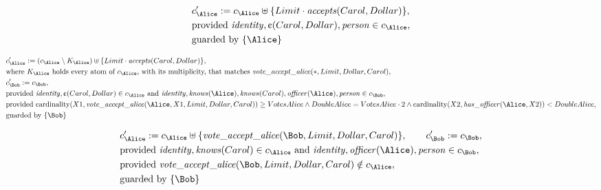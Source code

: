 \begin{align*}
&
c'_
{
\Alice
}
 := 
c_
{
\Alice
}
 \uplus 
\{
Limit
\cdot
\mathit{\detokenize{
accepts
}}
(
Carol
,
Dollar
)
\}
,\\
&
\text{provided } 
\mathit{\detokenize{
identity
}}
,
\text{\textcent}
(
Carol
,
Dollar
)
,
\mathit{\detokenize{
person
}}
 \in c_
{
\Alice
}
,\\
&
\text{guarded by } \{
\Alice
\}
\end{align*}

\begin{align*}
&
c'_
{
\Alice
}
 := 
(
c_
{
\Alice
}
 \setminus K_
{
\Alice
}
) \uplus 
\{
Limit
\cdot
\mathit{\detokenize{
accepts
}}
(
Carol
,
Dollar
)
\}
,\\
&
\text{where } K_
{
\Alice
}
 \text{ holds every atom of } c_
{
\Alice
}
 \text{, with its multiplicity, that matches } 
\mathit{\detokenize{
vote_accept_alice
}}
(
\ast
,
Limit
,
Dollar
,
Carol
)
,\\
&
c'_
{
\Bob
}
 := 
c_
{
\Bob
}
,\\
&
\text{provided } 
\mathit{\detokenize{
identity
}}
,
\text{\textcent}
(
Carol
,
Dollar
)
 \in c_
{
\Alice
}
 \text{ and } 
\mathit{\detokenize{
identity
}}
,
\mathit{\detokenize{
knows
}}
(
\Alice
)
,
\mathit{\detokenize{
knows
}}
(
Carol
)
,
\mathit{\detokenize{
officer
}}
(
\Alice
)
,
\mathit{\detokenize{
person
}}
 \in c_
{
\Bob
}
,\\
&
\text{provided } 
\mathrm{cardinality}(
X1
,
\mathit{\detokenize{
vote_accept_alice
}}
(
\Alice
,
X1
,
Limit
,
Dollar
,
Carol
)
)
\ge
VotesAlice
\land
DoubleAlice
=
VotesAlice
\cdot
2
\land
\mathrm{cardinality}(
X2
,
\mathit{\detokenize{
has_officer
}}
(
\Alice
,
X2
)
)
<
DoubleAlice
,\\
&
\text{guarded by } \{
\Bob
\}
\end{align*}

\begin{align*}
&
c'_
{
\Alice
}
 := 
c_
{
\Alice
}
 \uplus 
\{
\mathit{\detokenize{
vote_accept_alice
}}
(
\Bob
,
Limit
,
Dollar
,
Carol
)
\}
, \qquad 
c'_
{
\Bob
}
 := 
c_
{
\Bob
}
,\\
&
\text{provided } 
\mathit{\detokenize{
identity
}}
,
\mathit{\detokenize{
knows
}}
(
Carol
)
 \in c_
{
\Alice
}
 \text{ and } 
\mathit{\detokenize{
identity
}}
,
\mathit{\detokenize{
officer
}}
(
\Alice
)
,
\mathit{\detokenize{
person
}}
 \in c_
{
\Bob
}
,\\
&
\text{provided } 
\mathit{\detokenize{
vote_accept_alice
}}
(
\Bob
,
Limit
,
Dollar
,
Carol
)
 \notin c_
{
\Alice
}
,\\
&
\text{guarded by } \{
\Bob
\}
\end{align*}
